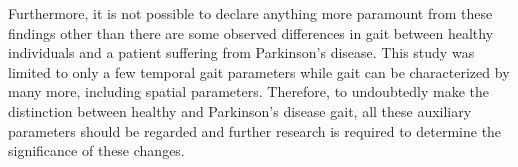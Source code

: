 Furthermore, it is not possible to declare anything more paramount from these findings other than there are some observed differences in gait between healthy individuals and a patient suffering from Parkinson's disease. This study was limited to only a few temporal gait parameters while gait can be characterized by many more, including spatial parameters. Therefore, to undoubtedly make the distinction between healthy and Parkinson's disease gait, all these auxiliary parameters should be regarded and further research is required to determine the significance of these changes.

